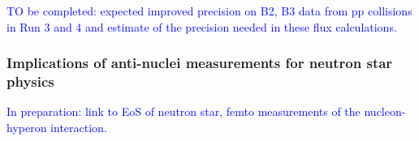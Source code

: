 \textcolor{blue}{TO be completed: expected improved precision on B2, B3 data from pp collisions in Run 3 and 4 and estimate of the precision needed in these flux calculations.}



\subsubsection{Implications of anti-nuclei measurements for neutron star physics}

\textcolor{blue}{In preparation: link to EoS of neutron star, femto measurements of the nucleon-hyperon interaction.}

